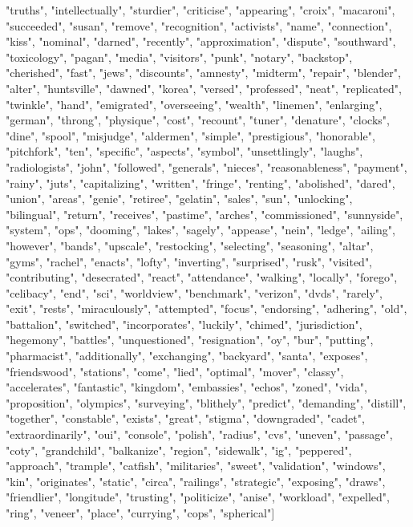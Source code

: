 "truths", "intellectually", "sturdier", "criticise", "appearing", "croix", "macaroni", "succeeded", "susan", "remove", "recognition", "activists", "name", "connection", "kiss", "nominal", "darned", "recently", "approximation", "dispute", "southward", "toxicology", "pagan", "media", "visitors", "punk", "notary", "backstop", "cherished", "fast", "jews", "discounts", "amnesty", "midterm", "repair", "blender", "alter", "huntsville", "dawned", "korea", "versed", "professed", "neat", "replicated", "twinkle", "hand", "emigrated", "overseeing", "wealth", "linemen", "enlarging", "german", "throng", "physique", "cost", "recount", "tuner", "denature", "clocks", "dine", "spool", "misjudge", "aldermen", "simple", "prestigious", "honorable", "pitchfork", "ten", "specific", "aspects", "symbol", "unsettlingly", "laughs", "radiologists", "john", "followed", "generals", "nieces", "reasonableness", "payment", "rainy", "juts", "capitalizing", "written", "fringe", "renting", "abolished", "dared", "union", "areas", "genie", "retiree", "gelatin", "sales", "sun", "unlocking", "bilingual", "return", "receives", "pastime", "arches", "commissioned", "sunnyside", "system", "ops", "dooming", "lakes", "sagely", "appease", "nein", "ledge", "ailing", "however", "bands", "upscale", "restocking", "selecting", "seasoning", "altar", "gyms", "rachel", "enacts", "lofty", "inverting", "surprised", "rusk", "visited", "contributing", "desecrated", "react", "attendance", "walking", "locally", "forego", "celibacy", "end", "sci", "worldview", "benchmark", "verizon", "dvds", "rarely", "exit", "rests", "miraculously", "attempted", "focus", "endorsing", "adhering", "old", "battalion", "switched", "incorporates", "luckily", "chimed", "jurisdiction", "hegemony", "battles", "unquestioned", "resignation", "oy", "bur", "putting", "pharmacist", "additionally", "exchanging", "backyard", "santa", "exposes", "friendswood", "stations", "come", "lied", "optimal", "mover", "classy", "accelerates", "fantastic", "kingdom", "embassies", "echos", "zoned", "vida", "proposition", "olympics", "surveying", "blithely", "predict", "demanding", "distill", "together", "constable", "exists", "great", "stigma", "downgraded", "cadet", "extraordinarily", "oui", "console", "polish", "radius", "cvs", "uneven", "passage", "coty", "grandchild", "balkanize", "region", "sidewalk", "ig", "peppered", "approach", "trample", "catfish", "militaries", "sweet", "validation", "windows", "kin", "originates", "static", "circa", "railings", "strategic", "exposing", "draws", "friendlier", "longitude", "trusting", "politicize", "anise", "workload", "expelled", "ring", "veneer", "place", "currying", "cops", "spherical"]